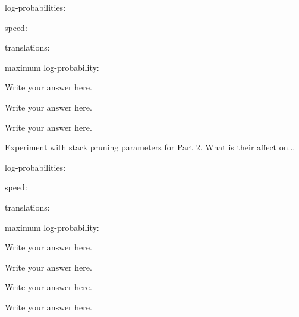 \documentclass[answers]{exam}
\begin{document}
\begin{questions}
\begin{framed}
\begin{compactenum}[a.]
\item log-probabilities:
\item speed:
\item translations:
\item maximum log-probability:
\end{compactenum}
\end{framed}


\begin{framed}
 Write your answer here.
\end{framed}


\begin{framed}
 Write your answer here.
\end{framed}


\begin{framed}
 Write your answer here.
\end{framed}


\addtocounter{question}{1}
\question[15] Experiment with stack pruning parameters for Part 2. What is their affect on...
\begin{framed}
\begin{compactenum}[a.]
\item log-probabilities:
\item speed:
\item translations:
\item maximum log-probability:
\end{compactenum}
\end{framed}


\begin{framed}
 Write your answer here.
\end{framed}


\begin{framed}
 Write your answer here.
\end{framed}


\begin{framed}
 Write your answer here.
\end{framed}


\addtocounter{question}{1}
\begin{framed}
 Write your answer here.
\end{framed}
\end{questions}
\end{document}
